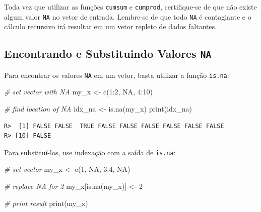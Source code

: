 \documentclass[
  11pt,
]{book}
\newenvironment{Shaded}{\begin{snugshade}}{\end{snugshade}}
\newcommand{\CommentTok}[1]{\textcolor[rgb]{0.37,0.37,0.37}{\textit{#1}}}
\newcommand{\ConstantTok}[1]{\textcolor[rgb]{0,0,0}{#1}}
\newcommand{\DecValTok}[1]{\textcolor[rgb]{0.06,0.06,0.06}{#1}}
\newcommand{\FunctionTok}[1]{\textcolor[rgb]{0,0,0}{#1}}
\newcommand{\NormalTok}[1]{#1}
\newcommand{\OtherTok}[1]{\textcolor[rgb]{0.37,0.37,0.37}{#1}}
\newcommand{\SpecialCharTok}[1]{\textcolor[rgb]{0,0,0}{#1}}
\newenvironment{rmdcaution}
{\begin{cautionblock}

} {\end{cautionblock}}
\begin{document}
\begin{rmdcaution}
Toda vez que utilizar as funções \texttt{cumsum} e \texttt{cumprod},
certifique-se de que não existe algum valor \texttt{NA} no vetor de
entrada. Lembre-se de que todo \texttt{NA} é contagiante e o cálculo
recursivo irá resultar em um vetor repleto de dados faltantes.
\end{rmdcaution}

\hypertarget{encontrando-e-substituindo-valores-na}{%
\subsection{\texorpdfstring{Encontrando e Substituindo Valores \texttt{NA}}{Encontrando e Substituindo Valores NA}}\label{encontrando-e-substituindo-valores-na}}

Para encontrar os valores \texttt{NA} em um vetor, basta utilizar a função \texttt{is.na}: 

\begin{Shaded}
\begin{Highlighting}[]
\CommentTok{\# set vector with NA}
\NormalTok{my\_x }\OtherTok{\textless{}{-}} \FunctionTok{c}\NormalTok{(}\DecValTok{1}\SpecialCharTok{:}\DecValTok{2}\NormalTok{, }\ConstantTok{NA}\NormalTok{, }\DecValTok{4}\SpecialCharTok{:}\DecValTok{10}\NormalTok{)}

\CommentTok{\# find location of NA}
\NormalTok{idx\_na }\OtherTok{\textless{}{-}} \FunctionTok{is.na}\NormalTok{(my\_x)}
\FunctionTok{print}\NormalTok{(idx\_na)}
\end{Highlighting}
\end{Shaded}

\begin{verbatim}
R>  [1] FALSE FALSE  TRUE FALSE FALSE FALSE FALSE FALSE FALSE
R> [10] FALSE
\end{verbatim}

Para substituí-los, use indexação com a saída de \texttt{is.na}:

\begin{Shaded}
\begin{Highlighting}[]
\CommentTok{\# set vector}
\NormalTok{my\_x }\OtherTok{\textless{}{-}} \FunctionTok{c}\NormalTok{(}\DecValTok{1}\NormalTok{, }\ConstantTok{NA}\NormalTok{, }\DecValTok{3}\SpecialCharTok{:}\DecValTok{4}\NormalTok{, }\ConstantTok{NA}\NormalTok{)}

\CommentTok{\# replace NA for 2}
\NormalTok{my\_x[}\FunctionTok{is.na}\NormalTok{(my\_x)] }\OtherTok{\textless{}{-}} \DecValTok{2}

\CommentTok{\# print result}
\FunctionTok{print}\NormalTok{(my\_x)}
\end{Highlighting}
\end{Shaded}
\end{document}
